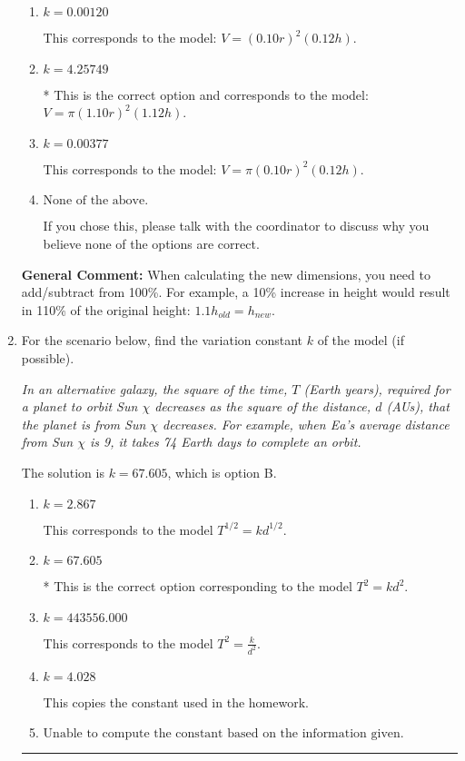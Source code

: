 \documentclass{extbook}[14pt]
\newcommand{\litem}[1]{\item #1

\rule{\textwidth}{0.4pt}}
\begin{document}
\begin{enumerate}
{\begin{enumerate}[label=\Alph*.]
This corresponds to the model: $V = (1.10 r)^2 (1.12 h)$.
\item \( k = 0.00120 \)

This corresponds to the model: $V = (0.10 r)^2 (0.12 h)$.
\item \( k = 4.25749 \)

* This is the correct option and corresponds to the model: $V = \pi (1.10 r)^2 (1.12 h)$.
\item \( k = 0.00377 \)

This corresponds to the model: $V = \pi (0.10 r)^2 (0.12 h)$.
\item \( \text{None of the above.} \)

If you chose this, please talk with the coordinator to discuss why you believe none of the options are correct.
\end{enumerate}

\textbf{General Comment:} When calculating the new dimensions, you need to add/subtract from 100\%. For example, a 10\% increase in height would result in 110\% of the original height: $1.1h_{old} = h_{new}$.
}
\litem{
For the scenario below, find the variation constant $k$ of the model (if possible).

\begin{center}
    \textit{ In an alternative galaxy, the square of the time, $T$ (Earth years), required for a planet to orbit Sun $\chi$ decreases as the square of the distance, $d$ (AUs), that the planet is from Sun $\chi$ decreases. For example, when Ea's average distance from Sun $\chi$ is 9, it takes 74 Earth days to complete an orbit. }
\end{center}
The solution is \( k = 67.605 \), which is option B.\begin{enumerate}[label=\Alph*.]
\item \( k = 2.867 \)

This corresponds to the model $T^{1/2} = k d^{1/2}$.
\item \( k = 67.605 \)

* This is the correct option corresponding to the model $T^{2} = k d^{2}$.
\item \( k = 443556.000 \)

This corresponds to the model $T^{2} = \frac{k}{d^{2}}$.
\item \( k = 4.028 \)

This copies the constant used in the homework.
\item \( \text{Unable to compute the constant based on the information given.} \)


\end{enumerate}}
\end{enumerate}
\end{document}
